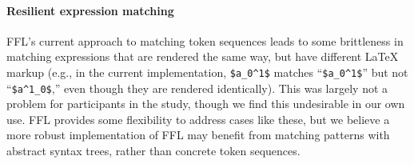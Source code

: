 

\paragraph{Resilient expression matching} FFL's current approach to matching token sequences leads to some brittleness in matching expressions that are rendered the same way, but have different LaTeX markup (e.g., in the current implementation, \texttt{\$a\_0\textasciicircum{}1\$} matches ``\texttt{\$a\_0\textasciicircum{}1\$}'' but not ``\texttt{\$a\textasciicircum{}1\_0\$},'' even though they are rendered identically). This was largely not a problem for participants in the study, though we find this undesirable in our own use. FFL provides some flexibility to address cases like these, but we believe a more robust implementation of FFL may benefit from matching patterns with abstract syntax trees, rather than concrete token sequences.


